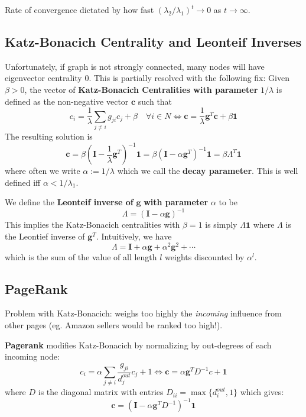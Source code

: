 \documentclass[9pt]{article}
\begin{document}
\begin{multicols}{2}
Rate of convergence dictated by how fast $(\lambda_2/\lambda_1)^t \to 0$ as $t \to \infty$.

\subsection{Katz-Bonacich Centrality and Leonteif Inverses}

Unfortunately, if graph is not strongly connected, many nodes will have eigenvector centrality $0$. This is partially resolved with the following fix:
Given $\beta > 0$, the vector of \textbf{Katz-Bonacich Centralities with parameter} $1/\lambda$ is defined as the
non-negative vector $\mathbf{c}$ such that 
\begin{equation}
c_i=\frac{1}{\lambda}\sum_{j \ne i}g_{ji}c_j + \beta \quad \forall{i} \in N \Leftrightarrow \mathbf{c}=\frac{1}{\lambda}\mathbf{g}^{T}\mathbf{c}+\beta\mathbf{1}
\end{equation}
The resulting solution is 
\begin{equation}
\mathbf{c}=\beta\left(\mathbf{I}-\frac{1}{\lambda}\mathbf{g}^{T}\right)^{-1}\mathbf{1}=\beta\left(\mathbf{I}-\alpha\mathbf{g}^{T}\right)^{-1}\mathbf{1} = \beta\Lambda^T \mathbf{1}
\end{equation}
where often we write $\alpha:=1/\lambda$ which we call the \textbf{decay parameter}. This is well defined iff $\alpha < 1/\lambda_1$.

We define the \textbf{Leonteif inverse of } $\mathbf{g}$ \textbf{with parameter } $\alpha$ to be $$\Lambda = (\mathbf{I}-\alpha\mathbf{g})^{-1}$$
This implies the Katz-Bonacich centralities with $\beta=1$ is simply $\Lambda\mathbf{1}$ where $\Lambda$ is the Leontief inverse of $\mathbf{g}^{T}$. Intuitively, we have 
$$\Lambda= \mathbf{I}+\alpha\mathbf{g}+\alpha^2\mathbf{g}^2+\cdots$$ which 
is the sum of the value of all length $l$ weights discounted by $\alpha^l$.

\subsection{PageRank}
Problem with Katz-Bonacich: weighs too highly the \textit{incoming} influence from other pages (eg. Amazon sellers would be ranked too high!).

\textbf{Pagerank} modifies Katz-Bonacich by normalizing by out-degrees of each incoming node:
\begin{equation}
c_i=\alpha\sum_{j \ne i}\frac{g_{ji}}{d_{j}^{out}}c_j+1\Leftrightarrow \mathbf{c}=\alpha\mathbf{g}^{T}D^{-1}c+\mathbf{1}
\end{equation}
where $D$ is the diagonal matrix with entries $D_{ii}=\max\{d_i^{out},1\}$ which gives:
\begin{equation}
\mathbf{c}=\left(\mathbf{I}-\alpha\mathbf{g}^{T}D^{-1}\right)^{-1}\mathbf{1}
\end{equation}


\end{multicols}
\end{document}
